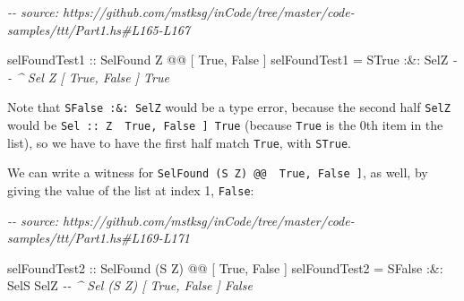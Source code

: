 \documentclass[]{article}
\newenvironment{Shaded}{}{}
\newcommand{\CommentTok}[1]{\textcolor[rgb]{0.38,0.63,0.69}{\textit{#1}}}
\newcommand{\DataTypeTok}[1]{\textcolor[rgb]{0.56,0.13,0.00}{#1}}
\newcommand{\NormalTok}[1]{#1}
\newcommand{\OperatorTok}[1]{\textcolor[rgb]{0.40,0.40,0.40}{#1}}
\newcommand{\OtherTok}[1]{\textcolor[rgb]{0.00,0.44,0.13}{#1}}
\begin{document}
\begin{Shaded}
\begin{Highlighting}[]
\CommentTok{{-}{-} source: https://github.com/mstksg/inCode/tree/master/code{-}samples/ttt/Part1.hs\#L165{-}L167}

\OtherTok{selFoundTest1 ::} \DataTypeTok{SelFound} \DataTypeTok{\textquotesingle{}Z} \OperatorTok{@@}\NormalTok{ \textquotesingle{}[ }\DataTypeTok{\textquotesingle{}True}\NormalTok{, }\DataTypeTok{\textquotesingle{}False}\NormalTok{ ]}
\NormalTok{selFoundTest1 }\OtherTok{=} \DataTypeTok{STrue} \OperatorTok{:\&:} \DataTypeTok{SelZ}
                       \CommentTok{{-}{-} \^{} Sel \textquotesingle{}Z \textquotesingle{}[ \textquotesingle{}True, \textquotesingle{}False ] \textquotesingle{}True}
\end{Highlighting}
\end{Shaded}

Note that \texttt{SFalse\ :\&:\ SelZ} would be a type error, because the second
half \texttt{SelZ} would be
\texttt{Sel\ ::\ \textquotesingle{}Z\ \textquotesingle{}{[}\ \textquotesingle{}True,\ \textquotesingle{}False\ {]}\ \textquotesingle{}True}
(because \texttt{\textquotesingle{}True} is the 0th item in the list), so we
have to have the first half match \texttt{\textquotesingle{}True}, with
\texttt{STrue}.

We can write a witness for
\texttt{SelFound\ (\textquotesingle{}S\ \textquotesingle{}Z)\ @@\ \textquotesingle{}{[}\ \textquotesingle{}True,\ \textquotesingle{}False\ {]}},
as well, by giving the value of the list at index 1,
\texttt{\textquotesingle{}False}:

\begin{Shaded}
\begin{Highlighting}[]
\CommentTok{{-}{-} source: https://github.com/mstksg/inCode/tree/master/code{-}samples/ttt/Part1.hs\#L169{-}L171}

\OtherTok{selFoundTest2 ::} \DataTypeTok{SelFound}\NormalTok{ (}\DataTypeTok{\textquotesingle{}S} \DataTypeTok{\textquotesingle{}Z}\NormalTok{) }\OperatorTok{@@}\NormalTok{ \textquotesingle{}[ }\DataTypeTok{\textquotesingle{}True}\NormalTok{, }\DataTypeTok{\textquotesingle{}False}\NormalTok{ ]}
\NormalTok{selFoundTest2 }\OtherTok{=} \DataTypeTok{SFalse} \OperatorTok{:\&:} \DataTypeTok{SelS} \DataTypeTok{SelZ}
                        \CommentTok{{-}{-} \^{} Sel (\textquotesingle{}S \textquotesingle{}Z) \textquotesingle{}[ \textquotesingle{}True, \textquotesingle{}False ] \textquotesingle{}False}
\end{Highlighting}
\end{Shaded}
\end{document}
